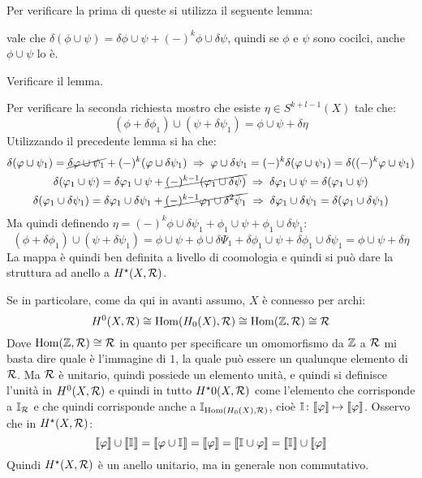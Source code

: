 Per verificare la prima di queste si utilizza il seguente lemma:
\begin{lemma}
  vale che $ \delta(\phi \cup \psi) = \delta \phi \cup \psi + (-)^k \phi \cup \delta \psi $, quindi se $ \phi $ e $ \psi $ sono cocilci,
  anche $ \phi \cup \psi $ lo è.
\end{lemma}
\begin{exercise}
  Verificare il lemma.
\end{exercise}
Per verificare la seconda richiesta mostro che esiste $ \eta \in S^{k+l-1}(X) $ tale che:
\[
  (\phi + \delta\phi_1) \cup (\psi + \delta\psi_1) = \phi \cup \psi + \delta \eta
\]
Utilizzando il precedente lemma si ha che:
\begin{gather*}
  \delta(\phi \cup \psi_1) = \cancel{\delta \phi \cup \psi_1} + (-)^k (\phi \cup \delta\psi_1) \; \Rightarrow \; \phi \cup \delta \psi_1 = (-)^k \delta(\phi \cup \psi_1) = \delta ((-)^k \phi \cup \psi_1) \\
  \delta(\phi_1 \cup \psi) = \delta \phi_1 \cup \psi + \cancel{(-)^{k-1}(\phi_1 \cup \delta \psi)} \; \Rightarrow \; \delta \phi_1 \cup \psi = \delta(\phi_1 \cup \psi) \\
  \delta(\phi_1 \cup \delta \psi_1) = \delta \phi_1 \cup \delta \psi_1 + \cancel{(-)^{k-1}\phi_1 \cup \delta^2 \psi_1} \; \Rightarrow \; \delta \phi_1 \cup \delta \psi_1  =  \delta(\phi_1 \cup \delta \psi_1)
\end{gather*}
Ma quindi definendo $ \eta = (-)^k \phi \cup \delta \psi_1 + \phi_1 \cup \psi + \phi_1 \cup \delta \psi_1 $:
\[
  (\phi + \delta \phi_1) \cup (\psi + \delta \psi_1) = \phi \cup \psi + \phi \cup \delta \Psi_1 + \delta \phi_1 \cup \psi + \delta \phi_1 \cup \delta \psi_1 = \phi \cup \psi + \delta \eta
\]
La mappa è quindi ben definita a livello di coomologia e quindi si può dare la struttura
ad anello a $ H^\star(X,\R) $.

Se in particolare, come da qui in avanti assumo, $ X $ è connesso per archi:
\[
  H^0(X, \R) \cong \hom{H_0(X), \R} \cong \hom{\Z, \R} \cong \R
\]
Dove $ \hom{\Z, \R} \cong \R $ in quanto per specificare un omomorfismo da
$ \Z $ a $ \R $ mi basta dire quale è l'immagine di $ 1 $, la quale può essere
un qualunque elemento di $ \R $. Ma $ \R $ è unitario, quindi possiede un
elemento unità, e quindi si definisce l'unità in $ H^0(X, \R) $ e quindi in
tutto $ H^\star0(X, \R) $ come l'elemento che corrisponde a $ \Id{\R} $ e che quindi
corrisponde anche a $ \Id{\hom{H_0(X), \R}} $, cioè $ \Id{} \colon \llbracket \phi \rrbracket \mapsto \llbracket \phi \rrbracket $.
Osservo che in $ H^\star(X, \R) $:
\[
  \llbracket \phi \rrbracket \cup \llbracket \Id{} \rrbracket = \llbracket \phi \cup \Id{} \rrbracket = \llbracket \phi \rrbracket = \llbracket \Id{} \cup \phi \rrbracket = \llbracket \Id{} \rrbracket \cup \llbracket \phi \rrbracket
\]
Quindi $ H^\star(X, \R) $ è un anello unitario, ma in generale non commutativo.

